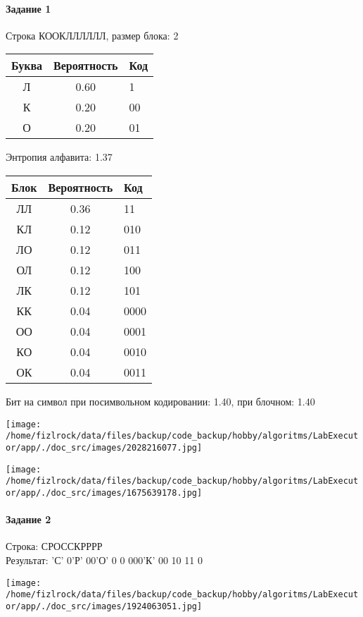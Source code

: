 \documentclass[a4paper, 12pt]{article}
\begin{document}
\paragraph{Задание 1}

Строка КООКЛЛЛЛЛЛ, размер блока: 2
\begin{center}
 \begin{tabular}{ |c|c|l| } 
  \hline
     Буква & Вероятность & Код\\ \hline
Л & 0.60 & 1\\\hline
К & 0.20 & 00\\\hline
О & 0.20 & 01
\\ \hline \end{tabular}
\end{center}
Энтропия алфавита: 1.37
\begin{center}
 \begin{tabular}{ |c|c|l| } 
  \hline
     Блок & Вероятность & Код\\ \hline
ЛЛ & 0.36 & 11\\\hline
КЛ & 0.12 & 010\\\hline
ЛО & 0.12 & 011\\\hline
ОЛ & 0.12 & 100\\\hline
ЛК & 0.12 & 101\\\hline
КК & 0.04 & 0000\\\hline
ОО & 0.04 & 0001\\\hline
КО & 0.04 & 0010\\\hline
ОК & 0.04 & 0011
\\ \hline \end{tabular}
\end{center}
Бит на символ при посимвольном кодировании: 1.40, при блочном: 1.40

\texttt{[image: /home/fizlrock/data/files/backup/code\_backup/hobby/algoritms/LabExecutor/app/./doc\_src/images/2028216077.jpg]}

\texttt{[image: /home/fizlrock/data/files/backup/code\_backup/hobby/algoritms/LabExecutor/app/./doc\_src/images/1675639178.jpg]}
\pagebreak
\paragraph{Задание 2}

Строка: 
СРОССКРРРР\\
Результат: 'С' 0'Р' 00'О' 0 0 000'К' 00 10 11 0

\texttt{[image: /home/fizlrock/data/files/backup/code\_backup/hobby/algoritms/LabExecutor/app/./doc\_src/images/1924063051.jpg]}
\end{document}

